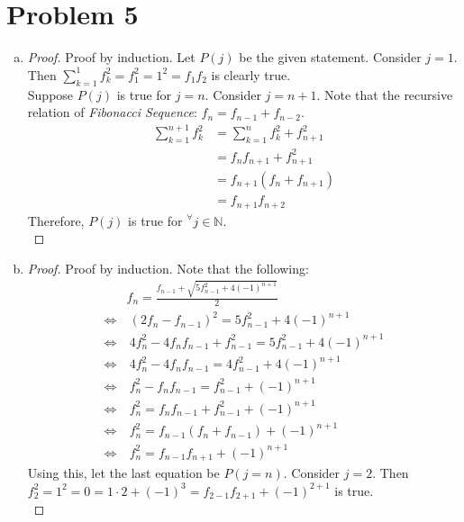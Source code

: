 \section*{Problem 5}
	\begin{enumerate} [(a)]
		\item 
		\begin{proof}
			Proof by induction. Let $P(j)$ be the given statement. Consider $j = 1$. Then $\sum\limits_{k = 1}^1 f_k^2 = f_1^2 = 1^2 = f_1f_2$ is clearly true.\\
			Suppose $P(j)$ is true for $j = n$. Consider $j = n + 1$. Note that the recursive relation of \textit{Fibonacci Sequence}: $f_n = f_{n - 1} + f_{n - 2}$.
			\begin{align*}
				\sum\limits_{k = 1}^{n + 1} f_k^2 &= \sum\limits_{k = 1}^{n} f_k^2 + f_{n + 1}^2\\
				&= f_nf_{n + 1} + f_{n + 1}^2\\
				&= f_{n + 1}(f_n + f_{n + 1})\\
				&= f_{n + 1}f_{n + 2}
			\end{align*}
			Therefore, $P(j)$ is true for $^\forall j\in\mathbb{N}$.\\
		\end{proof}
		\item 
		\begin{proof}
			Proof by induction. Note that the following:
			\begin{align*}
				&f_n = \frac{f_{n - 1} + \sqrt{5f_{n - 1}^2 + 4(-1)^{n + 1}}}{2}\\
				\Leftrightarrow&\ (2f_n - f_{n - 1})^2 = 5f_{n - 1}^2 + 4(-1)^{n + 1}\\
				\Leftrightarrow&\ 4f_n^2 - 4f_nf_{n - 1} + f_{n - 1}^2 = 5f_{n - 1}^2 + 4(-1)^{n + 1}\\
				\Leftrightarrow&\ 4f_n^2 - 4f_nf_{n - 1} = 4f_{n - 1}^2 + 4(-1)^{n + 1}\\
				\Leftrightarrow&\ f_n^2 - f_nf_{n - 1} = f_{n - 1}^2 + (-1)^{n + 1}\\
				\Leftrightarrow&\ f_n^2 = f_nf_{n - 1} + f_{n - 1}^2 + (-1)^{n + 1}\\
				\Leftrightarrow&\ f_n^2 = f_{n - 1}(f_n + f_{n - 1}) + (-1)^{n + 1}\\
				\Leftrightarrow&\ f_n^2 = f_{n - 1}f_{n + 1} + (-1)^{n + 1}
			\end{align*}
			Using this, let the last equation be $P(j = n)$. Consider $j = 2$. Then $f_2^2 = 1^2 = 0 = 1 \cdot 2 + (-1)^3 = f_{2 - 1}f_{2 + 1} + (-1)^{2 + 1}$ is true.\\

\end{proof}
\end{enumerate}
